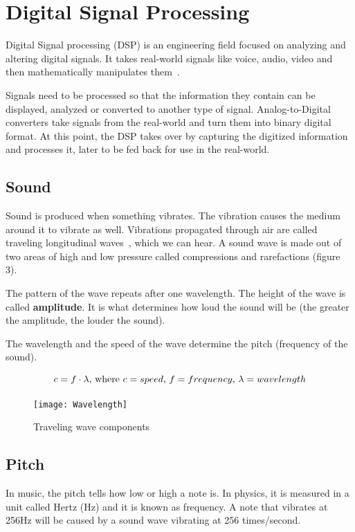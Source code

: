 \section{Digital Signal Processing}
Digital Signal processing (DSP) is an engineering field focused on analyzing and altering digital signals. It takes real-world signals like voice, audio, video and then mathematically manipulates them~\cite{dsp}. \par

Signals need to be processed so that the information they contain can be displayed, analyzed or converted to another type of signal. Analog-to-Digital converters take signals from the real-world and turn them into binary digital format. At this point, the DSP takes over by capturing the digitized information and processes it, later to be fed back for use in the real-world. \par

\subsection{Sound}
\par
Sound is produced when something vibrates. The vibration causes the medium around it to vibrate as well. Vibrations propagated through air are called traveling longitudinal waves~\cite{physics_of_sound}, which we can hear.
A sound wave is made out of two areas of high and low pressure called compressions and rarefactions (figure 3). \par

The pattern of the wave repeats after one wavelength. The height of the wave is called \textbf{amplitude}. It is what determines how loud the sound will be (the greater the amplitude, the louder the sound).

The wavelength and the speed of the wave determine the pitch (frequency of the sound). \par 


\begin{equation}
c = f \cdot \lambda \textnormal{, where $c=speed$, $f=frequency$, $\lambda=wavelength$}
\end{equation}

\begin{figure}[h]
	\caption[Traveling Wave]{
		Traveling wave components~\cite{traveling_wave} }
	\centering
	\texttt{[image: Wavelength]}
\end{figure}

\subsection{Pitch}
In music, the pitch tells how low or high a note is. In physics, it is measured in a unit called Hertz (Hz) and it is known as frequency. A note that vibrates at 256Hz will be caused by a sound wave vibrating at 256 times/second. \par

